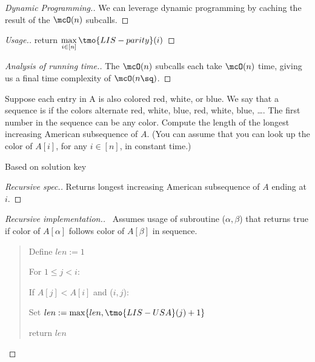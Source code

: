 \documentclass{article}
\begin{document}
\begin{proof}[Dynamic Programming.]
  We can leverage dynamic programming by caching the result of the $ \mcO(n) $ subcalls.
\end{proof}

\begin{proof}[Usage.]
  return $ \max\limits_{i\in[n]} \tmo{LIS-parity}(i) $
\end{proof}

\begin{proof}[Analysis of running time.]
  The $ \mcO(n) $ subcalls each take $ \mcO(n) $ time, giving us a final time complexity of $ \mcO(n\sq) $.
\end{proof}
\pagebreak

\begin{subexercise}
  Suppose each entry in A is also colored red, white, or blue. We say that a sequence is  if the colors alternate red, white, blue, red, white, blue, \ldots.  The first number in the sequence can be any color. Compute the length of the longest increasing American subsequence of $ A $. (You can assume that you can look up the color of $A[i]$, for any $i \in [n]$, in constant time.)
\end{subexercise}

\begin{note}
  Based on solution key
\end{note}

\begin{proof}[Recursive spec.]
  Returns longest increasing American subsequence of $ A $ ending at $ i $.
\end{proof}

\begin{proof}[Recursive implementation.]\
Assumes usage of subroutine ($ \alpha,\beta $) that returns true if color of $ A[\alpha] $ follows color of $ A[\beta] $ in sequence.
\begin{quote}
\begin{steps}
  \item Define $ len := 1 $
  \item For $ 1\leq j < i $: \begin{steps}
    \item If $ A[j] < A[i] $ and ($ i,j $): \begin{steps}
      \item Set $ len := \max\{len, \tmo{LIS-USA}(j)+1\} $
    \end{steps}
  \end{steps}
  \item return $ len $
\end{steps}
\end{quote}
\end{proof}
\end{document}
